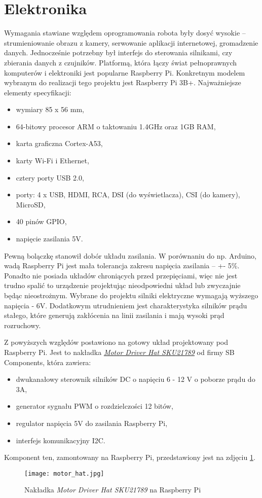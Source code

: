 \section{Elektronika}
Wymagania stawiane względem oprogramowania robota były dosyć wysokie -- strumieniowanie obrazu z kamery, serwowanie aplikacji internetowej, gromadzenie danych.
Jednocześnie potrzebny był interfejs do sterowania silnikami, czy zbierania danych z czujników.
Platformą, która łączy świat pełnoprawnych komputerów i elektroniki jest popularne Raspberry Pi.
Konkretnym modelem wybranym do realizacji tego projektu jest Raspberry Pi 3B+.
Najważniejsze elementy specyfikacji:
\begin{itemize}
    \item wymiary 85 x 56 mm,
    \item 64-bitowy procesor ARM o taktowaniu 1.4GHz oraz 1GB RAM,
    \item karta graficzna Cortex-A53,
    \item karty Wi-Fi i Ethernet,
    \item cztery porty USB 2.0,
    \item porty: 4 x USB, HDMI, RCA, DSI (do wyświetlacza), CSI (do kamery), MicroSD,
    \item 40 pinów GPIO,
    \item napięcie zasilania 5V.
\end{itemize}

Pewną bolączkę stanowił dobór układu zasilania.
W porównaniu do np. Arduino, wadą Raspberry Pi jest mała tolerancja zakresu napięcia zasilania -- +- 5\%.
Ponadto nie posiada układów chroniących przed przepięciami, więc nie jest trudno spalić to urządzenie projektując nieodpowiedni układ lub zwyczajnie będąc nieostrożnym.
Wybrane do projektu silniki elektryczne wymagają wyższego napięcia - 6V.
Dodatkowym utrudnieniem jest charakterystyka silników prądu stałego, które generują zakłócenia na linii zasilania i mają wysoki prąd rozruchowy.

\label{motor_hat}
Z powyższych względów postawiono na gotowy układ projektowany pod Raspberry Pi.
Jest to nakładka \href{https://shop.sb-components.co.uk/products/motor-driver-hat-for-raspberry-pi}{\textit{Motor Driver Hat SKU21789}} od firmy SB Components, która zawiera:
\begin{itemize}
    \item dwukanałowy sterownik silników DC o napięciu 6 - 12 V o poborze prądu do 3A,
    \item generator sygnału PWM o rozdzielczości 12 bitów,
    \item regulator napięcia 5V do zasilania Raspberry Pi,
    \item interfejs komunikacyjny I2C.
\end{itemize}
Komponent ten, zamontowany na Raspberry Pi, przedstawiony jest na zdjęciu \ref{rys:motor_hat}.
\begin{figure}[!hb]
    \centering \texttt{[image: motor\_hat.jpg]}
    \caption{Nakładka \textit{Motor Driver Hat SKU21789} na Raspberry Pi}
    \label{rys:motor_hat}
\end{figure}


